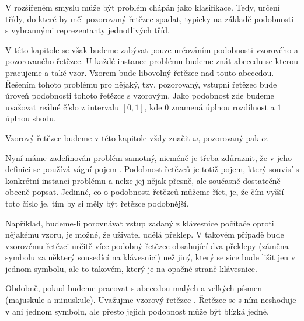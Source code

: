\documentclass[a4paper,10pt]{article}
\begin{document}
V rozšířeném smyslu může být problém chápán jako klasifikace. Tedy, určení třídy, do které by měl pozorovaný řetězec spadat, typicky na základě podobnosti s vybrannými reprezentanty jednotlivých tříd. 

V této kapitole se však budeme zabývat pouze určováním podobnosti vzorového a pozorovaného řetězce. U každé instance problému budeme znát abecedu se kterou pracujeme a také vzor. Vzorem bude libovolný řetězec nad touto abecedou. Řešením tohoto problému pro nějaký, tzv. pozorovaný, vstupní řetězec bude úroveň podobnosti tohoto řetězce s vzorovým. Jako podobnost zde budeme uvažovat reálné číslo z intervalu $[0, 1]$, kde $0$ znamená úplnou rozdílnost a $1$ úplnou shodu. 

\begin{note}
 Vzorový řetězec budeme v této kapitole vždy značit $\omega$, pozorovaný pak $\alpha$.
\end{note}

Nyní máme zadefinován problém samotný, nicméně je třeba zdůraznit, že v jeho definici se používá vágní pojem . Podobnost řetězců je totiž pojem, který souvisí s konkrétní instancí problému a nelze jej nějak přesně, ale současně dostatečně obecně popsat. Jedinné, co o podobnosti řetězců můžeme říct, je, že čím vyšší toto číslo je, tím by si měly být řetězce podobnější.

Například, budeme-li porovnávat vstup zadaný z klávesnice počítače oproti nějakému vzoru, je možné, že uživatel udělá překlep. V takovém případě bude vzorovému řetězci určitě více podobný řetězec obsahující dva překlepy (záměna symbolu za některý sousedící na klávesnici) než jiný, který se sice bude lišit jen v jednom symbolu, ale to takovém, který je na opačné straně klávesnice.

Obdobně, pokud budeme pracovat s abecedou malých a velkých písmen (majuskule a minuskule). Uvažujme vzorový řetězec . Řetězec  se s ním neshoduje v ani jednom symbolu, ale přesto jejich podobnost může být blízká jedné.

\end{document}
